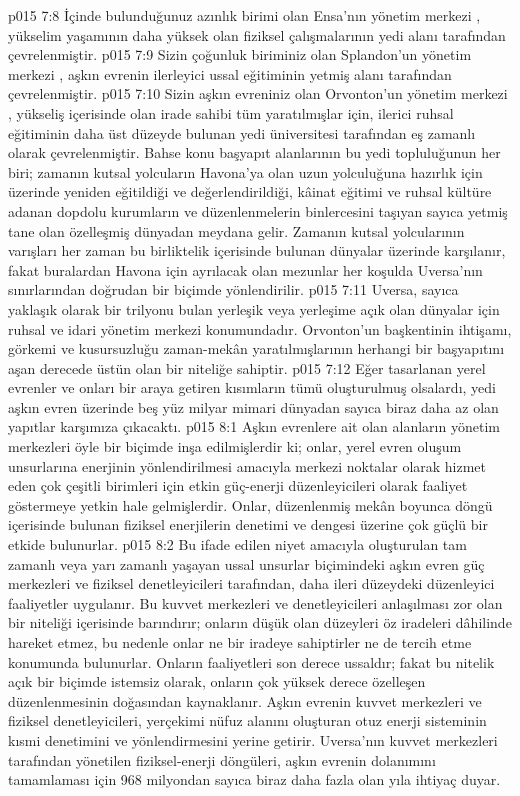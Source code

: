 \vs p015 7:8 İçinde bulunduğunuz azınlık birimi olan Ensa’nın yönetim merkezi , yükselim yaşamının daha yüksek olan fiziksel çalışmalarının yedi alanı tarafından çevrelenmiştir.
\vs p015 7:9 Sizin çoğunluk biriminiz olan Splandon’un yönetim merkezi , aşkın evrenin ilerleyici ussal eğitiminin yetmiş alanı tarafından çevrelenmiştir.
\vs p015 7:10 Sizin aşkın evreniniz olan Orvonton’un yönetim merkezi , yükseliş içerisinde olan irade sahibi tüm yaratılmışlar için, ilerici ruhsal eğitiminin daha üst düzeyde bulunan yedi üniversitesi tarafından eş zamanlı olarak çevrelenmiştir. Bahse konu başyapıt alanlarının bu yedi topluluğunun her biri; zamanın kutsal yolcuların Havona’ya olan uzun yolculuğuna hazırlık için üzerinde yeniden eğitildiği ve değerlendirildiği, kâinat eğitimi ve ruhsal kültüre adanan dopdolu kurumların ve düzenlenmelerin binlercesini taşıyan sayıca yetmiş tane olan özelleşmiş dünyadan meydana gelir. Zamanın kutsal yolcularının varışları her zaman bu birliktelik içerisinde bulunan dünyalar üzerinde karşılanır, fakat buralardan Havona için ayrılacak olan mezunlar her koşulda Uversa’nın sınırlarından doğrudan bir biçimde yönlendirilir.
\vs p015 7:11 Uversa, sayıca yaklaşık olarak bir trilyonu bulan yerleşik veya yerleşime açık olan dünyalar için ruhsal ve idari yönetim merkezi konumundadır. Orvonton’un başkentinin ihtişamı, görkemi ve kusursuzluğu zaman\hyp{}mekân yaratılmışlarının herhangi bir başyapıtını aşan derecede üstün olan bir niteliğe sahiptir.
\vs p015 7:12 Eğer tasarlanan yerel evrenler ve onları bir araya getiren kısımların tümü oluşturulmuş olsalardı, yedi aşkın evren üzerinde beş yüz milyar mimari dünyadan sayıca biraz daha az olan yapıtlar karşımıza çıkacaktı.
\vs p015 8:1 Aşkın evrenlere ait olan alanların yönetim merkezleri öyle bir biçimde inşa edilmişlerdir ki; onlar, yerel evren oluşum unsurlarına enerjinin yönlendirilmesi amacıyla merkezi noktalar olarak hizmet eden çok çeşitli birimleri için etkin güç\hyp{}enerji düzenleyicileri olarak faaliyet göstermeye yetkin hale gelmişlerdir. Onlar, düzenlenmiş mekân boyunca döngü içerisinde bulunan fiziksel enerjilerin denetimi ve dengesi üzerine çok güçlü bir etkide bulunurlar.
\vs p015 8:2 Bu ifade edilen niyet amacıyla oluşturulan tam zamanlı veya yarı zamanlı yaşayan ussal unsurlar biçimindeki aşkın evren güç merkezleri ve fiziksel denetleyicileri tarafından, daha ileri düzeydeki düzenleyici faaliyetler uygulanır. Bu kuvvet merkezleri ve denetleyicileri anlaşılması zor olan bir niteliği içerisinde barındırır; onların düşük olan düzeyleri öz iradeleri dâhilinde hareket etmez, bu nedenle onlar ne bir iradeye sahiptirler ne de tercih etme konumunda bulunurlar. Onların faaliyetleri son derece ussaldır; fakat bu nitelik açık bir biçimde istemsiz olarak, onların çok yüksek derece özelleşen düzenlenmesinin doğasından kaynaklanır. Aşkın evrenin kuvvet merkezleri ve fiziksel denetleyicileri, yerçekimi nüfuz alanını oluşturan otuz enerji sisteminin kısmi denetimini ve yönlendirmesini yerine getirir. Uversa’nın kuvvet merkezleri tarafından yönetilen fiziksel\hyp{}enerji döngüleri, aşkın evrenin dolanımını tamamlaması için 968 milyondan sayıca biraz daha fazla olan yıla ihtiyaç duyar.

